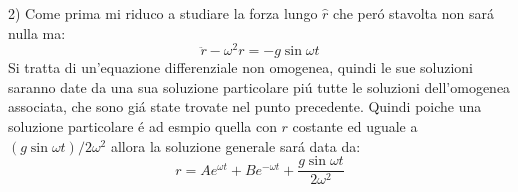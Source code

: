 \documentclass[../main.tex]{subfiles}
\begin{document}
2) Come prima mi riduco a studiare la forza lungo $\hat{r}$ che per\'{o} stavolta non sar\'{a} nulla ma:
\begin{equation}\label{avr:4}
  \ddot{r}-\omega^2r=-g \sin{\omega t}
 \end{equation}
Si tratta di un'equazione differenziale non omogenea, quindi le sue soluzioni saranno date da una sua soluzione particolare pi\'{u} tutte le soluzioni dell'omogenea associata,
che sono gi\'{a} state trovate nel punto precedente. Quindi poiche una soluzione particolare \'{e} ad esmpio quella con $r$ costante ed uguale a 
$(g \sin{\omega t})/2\omega^2$ allora la soluzione generale sar\'{a} data da:
\begin{equation}\label{avr:5}
 r=Ae^{\omega t}+Be^{-\omega t}+\frac{g \sin{\omega t}}{2\omega^2}
\end{equation}
\end{document}
